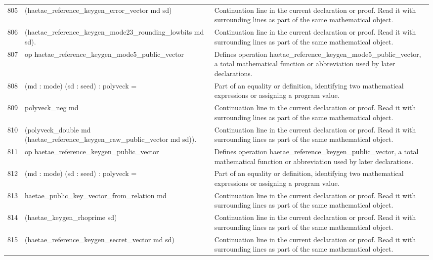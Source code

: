 \documentclass[10pt]{article}
\begin{document}
\begin{longtable}{r L{0.53\textwidth} L{0.37\textwidth}}
805 & {\ttfamily\scriptsize     (haetae\_reference\_keygen\_error\_vector md sd)} & Continuation line in the current declaration or proof.  Read it with surrounding lines as part of the same mathematical object. \\
806 & {\ttfamily\scriptsize     (haetae\_reference\_keygen\_mode23\_rounding\_lowbits md sd).} & Continuation line in the current declaration or proof.  Read it with surrounding lines as part of the same mathematical object. \\
807 & {\ttfamily\scriptsize op haetae\_reference\_keygen\_mode5\_public\_vector} & Defines operation haetae\_reference\_keygen\_mode5\_public\_vector, a total mathematical function or abbreviation used by later declarations. \\
808 & {\ttfamily\scriptsize    (md : mode) (sd : seed) : polyveck =} & Part of an equality or definition, identifying two mathematical expressions or assigning a program value. \\
809 & {\ttfamily\scriptsize   polyveck\_neg md} & Continuation line in the current declaration or proof.  Read it with surrounding lines as part of the same mathematical object. \\
810 & {\ttfamily\scriptsize     (polyveck\_double md (haetae\_reference\_keygen\_raw\_public\_vector md sd)).} & Continuation line in the current declaration or proof.  Read it with surrounding lines as part of the same mathematical object. \\
811 & {\ttfamily\scriptsize op haetae\_reference\_keygen\_public\_vector} & Defines operation haetae\_reference\_keygen\_public\_vector, a total mathematical function or abbreviation used by later declarations. \\
812 & {\ttfamily\scriptsize    (md : mode) (sd : seed) : polyveck =} & Part of an equality or definition, identifying two mathematical expressions or assigning a program value. \\
813 & {\ttfamily\scriptsize   haetae\_public\_key\_vector\_from\_relation md} & Continuation line in the current declaration or proof.  Read it with surrounding lines as part of the same mathematical object. \\
814 & {\ttfamily\scriptsize     (haetae\_keygen\_rhoprime sd)} & Continuation line in the current declaration or proof.  Read it with surrounding lines as part of the same mathematical object. \\
815 & {\ttfamily\scriptsize     (haetae\_reference\_keygen\_secret\_vector md sd)} & Continuation line in the current declaration or proof.  Read it with surrounding lines as part of the same mathematical object. \\

\end{longtable}
\end{document}
